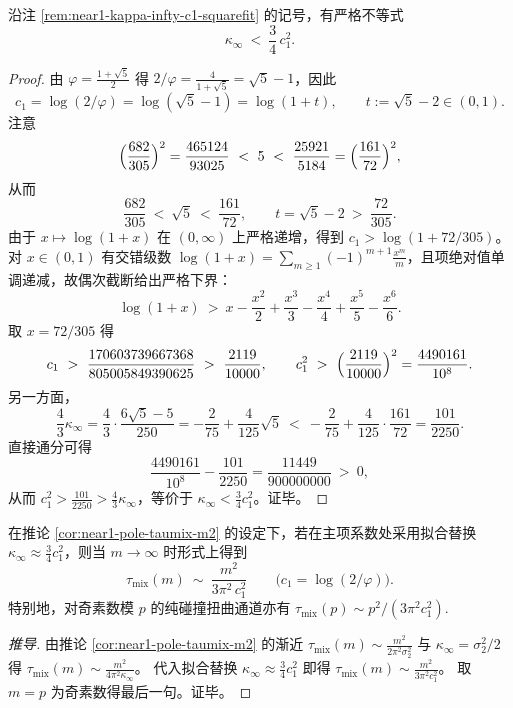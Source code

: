 \begin{proposition}\label{prop:near1-kappa-infty-c1-strict-ineq}
沿注 \ref{rem:near1-kappa-infty-c1-squarefit} 的记号，有严格不等式
\[
\kappa_\infty\ <\ \frac34\,c_1^2.
\]
\end{proposition}
\begin{proof}
由 \(\varphi=\frac{1+\sqrt5}{2}\) 得
\(
2/\varphi=\frac{4}{1+\sqrt5}=\sqrt5-1
\)，因此
\[
c_1=\log(2/\varphi)=\log(\sqrt5-1)=\log(1+t),\qquad t:=\sqrt5-2\in(0,1).
\]
注意
\[
\Bigl(\frac{682}{305}\Bigr)^2=\frac{465124}{93025}\ <\ 5\ <\ \frac{25921}{5184}=\Bigl(\frac{161}{72}\Bigr)^2,
\]
从而
\[
\frac{682}{305}\ <\ \sqrt5\ <\ \frac{161}{72},\qquad t=\sqrt5-2\ >\ \frac{72}{305}.
\]
由于 \(x\mapsto \log(1+x)\) 在 \((0,\infty)\) 上严格递增，得到
\(
c_1>\log(1+72/305)
\)。
对 \(x\in(0,1)\) 有交错级数
\(
\log(1+x)=\sum_{m\ge 1}(-1)^{m+1}\frac{x^m}{m}
\)，且项绝对值单调递减，故偶次截断给出严格下界：
\[
\log(1+x)\ >\ x-\frac{x^2}{2}+\frac{x^3}{3}-\frac{x^4}{4}+\frac{x^5}{5}-\frac{x^6}{6}.
\]
取 \(x=72/305\) 得
\[
c_1\ >\ \frac{170603739667368}{805005849390625}\ >\ \frac{2119}{10000},
\qquad
c_1^2\ >\ \Bigl(\frac{2119}{10000}\Bigr)^2=\frac{4490161}{10^8}.
\]
另一方面，
\[
\frac{4}{3}\kappa_\infty
=\frac{4}{3}\cdot\frac{6\sqrt5-5}{250}
=-\frac{2}{75}+\frac{4}{125}\sqrt5
\ <\ -\frac{2}{75}+\frac{4}{125}\cdot\frac{161}{72}
=\frac{101}{2250}.
\]
直接通分可得
\[
\frac{4490161}{10^8}-\frac{101}{2250}=\frac{11449}{900000000}\ >\ 0,
\]
从而 \(c_1^2>\frac{101}{2250}>\frac43\kappa_\infty\)，等价于 \(\kappa_\infty<\frac34 c_1^2\)。证毕。
\end{proof}

\begin{remark}\label{rem:near1-taumix-leading-coeff-from-c1}
在推论 \ref{cor:near1-pole-taumix-m2} 的设定下，若在主项系数处采用拟合替换 \(\kappa_\infty\approx \frac34 c_1^2\)，则当 \(m\to\infty\) 时形式上得到
\[
\tau_{\mathrm{mix}}(m)\ \sim\ \frac{m^2}{3\pi^2\,c_1^2}
\qquad\bigl(c_1=\log(2/\varphi)\bigr).
\]
特别地，对奇素数模 \(p\) 的纯碰撞扭曲通道亦有
\(
\tau_{\mathrm{mix}}(p)\sim {p^2}/{(3\pi^2c_1^2)}.
\)
\end{remark}
\begin{proof}[推导]
由推论 \ref{cor:near1-pole-taumix-m2} 的渐近
\(
\tau_{\mathrm{mix}}(m)\sim \frac{m^2}{2\pi^2\sigma_2^2}
\)
与 \(\kappa_\infty=\sigma_2^2/2\) 得
\(
\tau_{\mathrm{mix}}(m)\sim \frac{m^2}{4\pi^2\kappa_\infty}
\)。
代入拟合替换 \(\kappa_\infty\approx\frac34 c_1^2\) 即得
\(
\tau_{\mathrm{mix}}(m)\sim \frac{m^2}{3\pi^2c_1^2}
\)。
取 \(m=p\) 为奇素数得最后一句。证毕。
\end{proof}


